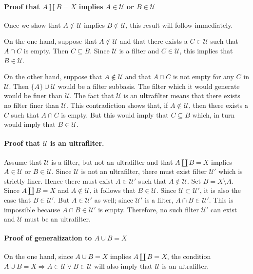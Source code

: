 \documentclass[12pt]{article}
\begin{document}
\paragraph {Proof that $A \coprod B = X$ implies $A \in \mathcal{U}$ or $B \in \mathcal{U}$}
Once we show that $A \notin \mathcal{U}$ implies $B \notin \mathcal{U}$, this result will follow immediately.

On the one hand, suppose that $A \notin \mathcal{U}$ and that there exists a $C \in \mathcal{U}$ such that $A \cap C$ is empty.  Then $C \subseteq B$.  Since $\mathcal{U}$ is a filter and $C \in \mathcal{U}$, this implies that $B \in \mathcal{U}$.

On the other hand, suppose that $A \notin \mathcal{U}$ and that $A \cap C$ is not empty for any $C$ in $\mathcal{U}$.  Then $\{A\} \cup \mathcal{U}$ would be a filter subbasis.  The filter which it would generate would be finer than $\mathcal{U}$.  The fact that $\mathcal{U}$ is an ultrafilter means that there exists no filter finer than $\mathcal{U}$.  This contradiction shows that, if $A \notin \mathcal{U}$, then there exists a $C$ such that $A \cap C$ is empty.  But this would imply that $C \subseteq B$ which, in turn would imply that $B \in \mathcal{U}$.

\paragraph{ Proof that $\mathcal{U}$ is an ultrafilter.}
Assume that $\mathcal{U}$ is a filter, but not an ultrafilter and that $A \coprod B = X$ implies $A \in \mathcal{U}$ or $B \in \mathcal{U}$.  Since $\mathcal{U}$ is not an ultrafilter, there must exist filter $\mathcal{U}'$ which is strictly finer.  Hence there must exist $A \in \mathcal{U}'$ such that $A \notin \mathcal{U}$.  Set $B = X \setminus A$.  Since $A \coprod B = X$ and $A \notin \mathcal{U}$, it follows that $B \in \mathcal{U}$.  Since $\mathcal{U} \subset \mathcal{U}'$, it is also the case that $B \in \mathcal{U}'$.  But $A \in \mathcal{U}'$ as well; since $\mathcal{U}'$ is a filter, $A \cap B \in \mathcal{U}'$.  This is impossible because $A \cap B \in \mathcal{U}'$ is empty.  Therefore, no such filter $\mathcal{U}'$ can exist and $\mathcal{U}$ must be an ultrafilter.

\paragraph{ Proof of generalization to $A \cup B = X$}
On the one hand, since $A \cup B = X$ implies $A \coprod B = X$, the condition $A \cup B = X \Rightarrow A \in \mathcal{U} \vee B\in \mathcal{U}$ will also imply that $\mathcal{U}$ is an ultrafilter.
\end{document}
